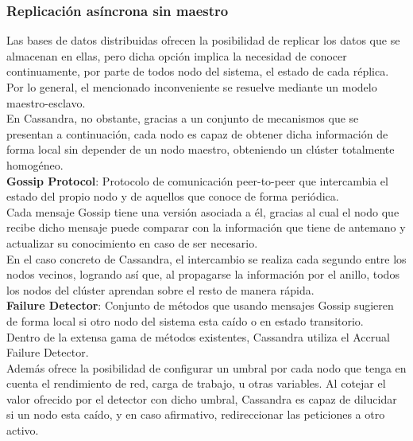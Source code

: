 \subsubsection{Replicación asíncrona sin maestro}

Las bases de datos distribuidas ofrecen la posibilidad de replicar los datos que se almacenan en ellas, pero dicha opción implica la necesidad de conocer continuamente, por parte de todos nodo del sistema, el estado de cada réplica. Por lo general, el mencionado inconveniente se resuelve mediante un modelo maestro-esclavo.\\

En Cassandra, no obstante, gracias a un conjunto de mecanismos que se presentan a continuación, cada nodo es capaz de obtener dicha información de forma local sin depender de un nodo maestro, obteniendo un clúster totalmente homogéneo.\\ 

\textbf{Gossip Protocol}\cite{demers1987epidemic}: Protocolo de comunicación peer-to-peer que intercambia el estado del propio nodo y de aquellos que conoce de forma periódica.\\

Cada mensaje Gossip tiene una versión asociada a él, gracias al cual el nodo que recibe dicho mensaje puede comparar con la información que tiene de antemano y actualizar su conocimiento en caso de ser necesario.\\

 En el caso concreto de Cassandra, el intercambio se realiza cada segundo entre los nodos vecinos, logrando así que, al propagarse la información por el anillo, todos los nodos del clúster aprendan sobre el resto de manera rápida.\\

\textbf{Failure Detector}\cite{chandra1996unreliable}: Conjunto de métodos que usando mensajes Gossip sugieren de forma local si otro nodo del sistema esta caído o en estado transitorio.\\

Dentro de la extensa gama de métodos existentes, Cassandra utiliza el Accrual Failure Detector\cite{hayashibara2004spl}.\\ 

Además ofrece la posibilidad de configurar un umbral por cada nodo que tenga en cuenta el rendimiento de red, carga de trabajo, u otras variables. Al cotejar el valor ofrecido por el detector con dicho umbral, Cassandra es capaz de dilucidar si un nodo esta caído, y en caso afirmativo, redireccionar las peticiones a otro activo.\\

